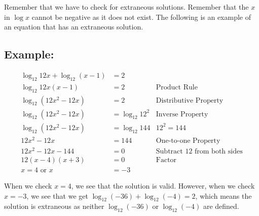 \documentclass[11pt]{article}
\begin{document}
Remember that we have to check for extraneous solutions. Remember that the $x$ in $\log x$ cannot be negative as it does not exist. The following is an example of an equation that has an extraneous solution.

\subsection*{Example:}
\begin{align*}
    \log_{12} 12x + \log_{12}(x-1) &= 2 \\
    \log_{12} 12x(x-1) &= 2 & \text{Product Rule} \\
    \log_{12}(12x^2 - 12x) &= 2 & \text{Distributive Property} \\
    \log_{12}(12x^2 - 12x) &= \log_{12}12^2 & \text{Inverse Property} \\
    \log_{12}(12x^2 - 12x) &= \log_{12}144 & 12^2 = 144 \\
    12x^2 - 12x &= 144 & \text{One-to-one Property}\\
    12x^2 - 12x - 144 &= 0 & \text{Subtract 12 from both sides} \\
    12(x-4)(x+3) &= 0 & \text{Factor} \\
    x = 4 \text{ or } x &= -3
\end{align*}

When we check $x = 4$, we see that the solution is valid. However, when we check $x = -3$, we see that we get $\log_{12}(-36) + \log_{12}(-4) = 2$, which means the solution is extraneous as neither $\log_{12}(-36)$ or $\log_{12}(-4)$ are defined.
\end{document}
